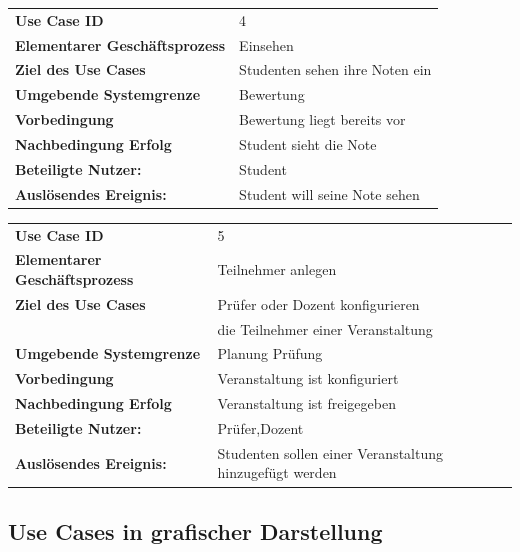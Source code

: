 			\begin{table}[H]
			\begin{tabular}{|ll}
			  \rowcolor{hellgrau}\textbf{Use Case ID} & 4 \\
		 	 \textbf{Elementarer Geschäftsprozess} &  Einsehen \\ 
			 \textbf{Ziel des Use Cases} & Studenten sehen ihre Noten ein  \\
			 \textbf{Umgebende Systemgrenze} & Bewertung \\ 
			 \textbf{Vorbedingung} & Bewertung liegt bereits vor \\
			 \textbf{Nachbedingung Erfolg} & Student sieht die Note\\
			 			    
			 \textbf{Beteiligte Nutzer:} & Student \\ 
		     \textbf{Auslösendes Ereignis:} & Student will seine Note sehen\\ 
			 
			\end{tabular} 
			\label{tab:usecase_4}
			\end{table}
			
			\begin{table}[H]
			\begin{tabular}{|ll}
			  \rowcolor{hellgrau}\textbf{Use Case ID} & 5 \\
		 	 \textbf{Elementarer Geschäftsprozess} &  Teilnehmer anlegen \\ 
			 \textbf{Ziel des Use Cases} & Prüfer oder Dozent konfigurieren \\& die Teilnehmer einer Veranstaltung  \\
			 \textbf{Umgebende Systemgrenze} & Planung Prüfung \\ 
			 \textbf{Vorbedingung} & Veranstaltung ist konfiguriert \\
			 \textbf{Nachbedingung Erfolg} & Veranstaltung ist freigegeben\\
			 			    
			 \textbf{Beteiligte Nutzer:} & Prüfer,Dozent \\ 
		     \textbf{Auslösendes Ereignis:} & Studenten sollen einer Veranstaltung hinzugefügt werden\\ 
			 
			\end{tabular} 
			\label{tab:usecase_5}
			\end{table}

						
		\clearpage
		\subsection{Use Cases in grafischer Darstellung}
		
